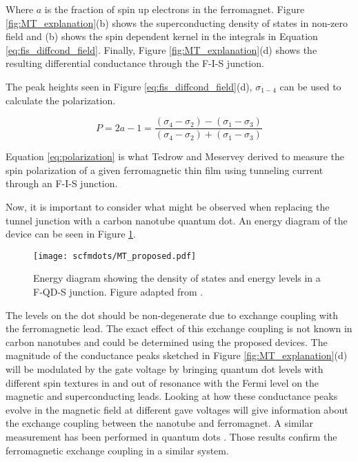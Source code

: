 Where $a$ is the fraction of spin up electrons in the ferromagnet. Figure \ref{fig:MT_explanation}(b) shows the superconducting density of states in non-zero field and (b) shows the spin dependent kernel in the integrals in Equation \ref{eq:fis_diffcond_field}. Finally, Figure \ref{fig:MT_explanation}(d) shows the resulting differential conductance through the F-I-S junction. 

The peak heights seen in Figure \ref{eq:fis_diffcond_field}(d), $\sigma_{1-4}$ can be used to calculate the polarization.

\begin{equation}
    \label{eq:polarization}
    P = 2a-1 = \frac{(\sigma_4 - \sigma_2) - (\sigma_1 - \sigma_3)}{(\sigma_4 - \sigma_2) + (\sigma_1 - \sigma_3)}
\end{equation}

Equation \ref{eq:polarization} is what Tedrow and Meservey derived to measure the spin polarization of a given ferromagnetic thin film using tunneling current through an F-I-S junction.

Now, it is important to consider what might be observed when replacing the tunnel junction with a carbon nanotube quantum dot. An energy diagram of the device can be seen in Figure \ref{fig:MT_proposed}.

\begin{figure}
    \centering
    \texttt{[image: scfmdots/MT\_proposed.pdf]}
    \caption{Energy diagram showing the density of states and energy levels in a F-QD-S junction. Figure adapted from \cite{Moodera2010}.}
    \label{fig:MT_proposed}
\end{figure}

The levels on the dot should be non-degenerate due to exchange coupling with the ferromagnetic lead. The exact effect of this exchange coupling is not known in carbon nanotubes and could be determined using the proposed devices. The magnitude of the conductance peaks sketched in Figure \ref{fig:MT_explanation}(d) will be modulated by the gate voltage by bringing quantum dot levels with different spin textures in and out of resonance with the Fermi level on the magnetic and superconducting leads. Looking at how these conductance peaks evolve in the magnetic field at different gave voltages will give information about the exchange coupling between the nanotube and ferromagnet. A similar measurement has been performed in  quantum dots \cite{Hofstetter2010}. Those results confirm the ferromagnetic exchange coupling in a similar system.

